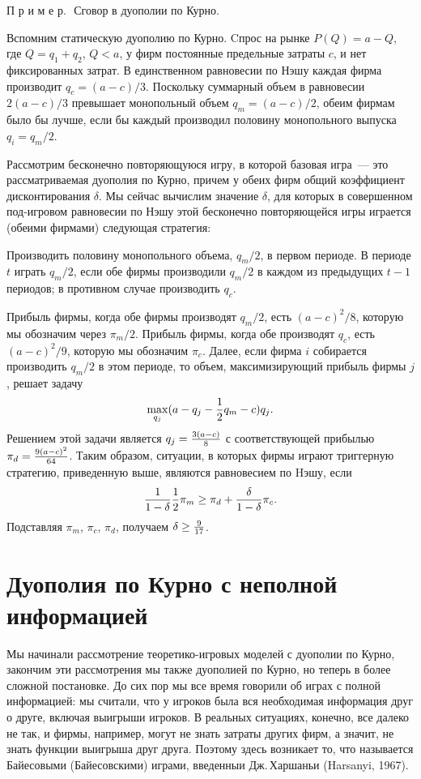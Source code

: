 П р и м е р.\,\, Сговор в дуополии по Курно.

Вспомним статическую дуополию по Курно. Cпрос на рынке $P(Q)=a-Q$, где
$Q=q_1+q_2$, $Q<a$, у фирм постоянные предельные затраты $c$, и нет
фиксированных затрат.  В единственном  равновесии по Нэшу каждая
фирма производит $q_c=(a-c)/3$.  Поскольку суммарный объем в
равновесии $2(a-c)/3$ превышает монопольный объем $q_m=(a-c)/2$,
обеим фирмам было бы лучше, если бы каждый производил половину
монопольного выпуска $q_i=q_m/2$.

Рассмотрим бесконечно повторяющуюся игру, в которой базовая
игра~--- это рассматриваемая дуополия по Курно, причем у обеих
фирм  общий коэффициент дисконтирования $\delta$. Мы сейчас
вычислим значение $\delta$, для которых в совершенном под-игровом
равновесии по Нэшу этой бесконечно повторяющейся игры играется
(обеими фирмами) следующая стратегия:

Производить половину монопольного объема, $q_m/2$, в первом периоде. В
периоде $t$ играть $q_m/2$, если обе фирмы производили $q_m/2$ в каждом из
предыдущих $t-1$ периодов; в противном случае производить $q_c$.

Прибыль фирмы, когда обе фирмы производят $q_m/2$, есть $(a-c)^2/8$,
которую мы обозначим через $\pi_m/2$. Прибыль фирмы, когда обе
производят $q_c$, есть $(a-c)^2/9$, которую мы обозначим $\pi_c$.
Далее, если фирма $i$ собирается производить $q_m/2$ в этом периоде,
то объем, максимизирующий прибыль фирмы $j$, решает задачу $$
\max_{q_j}(a-q_j-{1\over 2}q_m-c)q_j.
$$
Решением этой задачи является $q_j={{3(a-c)}\over 8}$ с
соответствующей прибылью $\pi_d={{9(a-c)^2}\over 64}$. Таким образом,
ситуации, в которых фирмы играют триггерную стратегию, приведенную
выше, являются равновесием по Hэшу, если
$$
{1\over{1-\delta}}{1\over 2}\pi_m\ge \pi_d+{\delta\over{1-\delta}}\pi_c.
$$
Подставляя
$\pi_m$, $\pi_c$, $\pi_d$, получаем  $\delta\ge{9\over 17}$.


\section{Дуополия по Курно с неполной информацией}

Мы начинали рассмотрение теоретико-игровых моделей с дуополии по Курно,
закончим эти рассмотрения мы также дуополией по Курно, но теперь в более
сложной постановке. До сих пор мы все время говорили об играх с полной
информацией: мы считали, что у игроков была вся необходимая
информация друг о друге, включая выигрыши игроков. В реальных
ситуациях, конечно, все далеко не так, и фирмы, например, могут не
знать затраты других фирм, а значит, не знать функции выигрыша
друг друга.  Поэтому здесь возникает то, что называется Байесовыми (Байесовскими)
играми, введенныи Дж.\,Харшаньи (Harsanyi, 1967).

